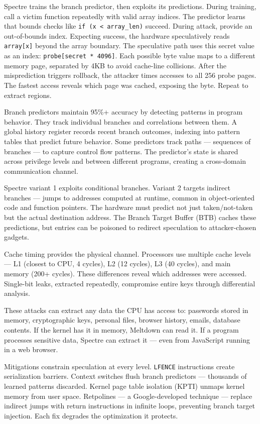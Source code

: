 Spectre trains the branch predictor, then exploits its predictions. During training, call a victim function repeatedly with valid array indices. The predictor learns that bounds checks like \texttt{if (x < array\_len)} succeed. During attack, provide an out-of-bounds index. Expecting success, the hardware speculatively reads \texttt{array[x]} beyond the array boundary. The speculative path uses this secret value as an index: \texttt{probe[secret * 4096]}. Each possible byte value maps to a different memory page, separated by 4KB to avoid cache-line collisions. After the misprediction triggers rollback, the attacker times accesses to all 256 probe pages. The fastest access reveals which page was cached, exposing the byte. Repeat to extract regions.

Branch predictors maintain 95\%+ accuracy by detecting patterns in program behavior. They track individual branches and correlations between them. A global history register records recent branch outcomes, indexing into pattern tables that predict future behavior. Some predictors track paths — sequences of branches — to capture control flow patterns. The predictor's state is shared across privilege levels and between different programs, creating a cross-domain communication channel.

Spectre variant 1 exploits conditional branches. Variant 2 targets indirect branches — jumps to addresses computed at runtime, common in object-oriented code and function pointers. The hardware must predict not just taken/not-taken but the actual destination address. The Branch Target Buffer (BTB) caches these predictions, but entries can be poisoned to redirect speculation to attacker-chosen gadgets.

Cache timing provides the physical channel. Processors use multiple cache levels — L1 (closest to CPU, 4 cycles), L2 (12 cycles), L3 (40 cycles), and main memory (200+ cycles). These differences reveal which addresses were accessed. Single-bit leaks, extracted repeatedly, compromise entire keys through differential analysis.

These attacks can extract any data the CPU has access to: passwords stored in memory, cryptographic keys, personal files, browser history, emails, database contents. If the kernel has it in memory, Meltdown can read it. If a program processes sensitive data, Spectre can extract it — even from JavaScript running in a web browser. 

Mitigations constrain speculation at every level. \texttt{LFENCE} instructions create serialization barriers. Context switches flush branch predictors — thousands of learned patterns discarded. Kernel page table isolation (KPTI) unmaps kernel memory from user space. Retpolines — a Google-developed technique — replace indirect jumps with return instructions in infinite loops, preventing branch target injection. Each fix degrades the optimization it protects.

